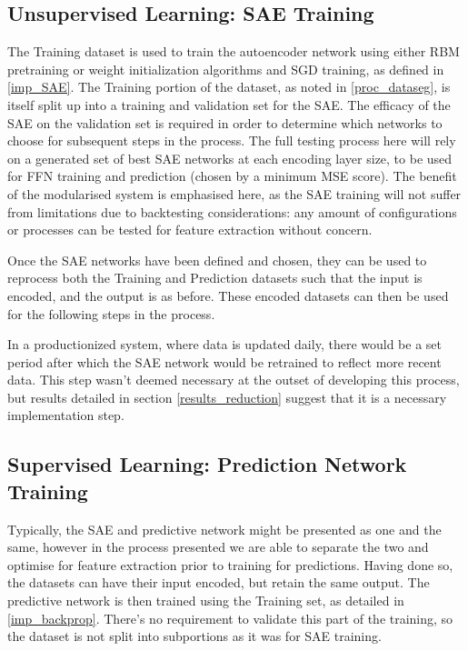 \documentclass[a4paper,11pt,oneside]{article}
\theoremstyle{plain}
\theoremstyle{definition}
\begin{document}
\subsection{Unsupervised Learning: SAE Training}\label{proc_sae}

The Training dataset is used to train the autoencoder network using either RBM pretraining or weight initialization algorithms and SGD training, as defined in \ref{imp_SAE}. The Training portion of the dataset, as noted in \ref{proc_dataseg}, is itself split up into a training and validation set for the SAE. The efficacy of the SAE on the validation set is required in order to determine which networks to choose for subsequent steps in the process. The full testing process here will rely on a generated set of best SAE networks at each encoding layer size, to be used for FFN training and prediction (chosen by a minimum MSE score). The benefit of the modularised system is emphasised here, as the SAE training will not suffer from limitations due to backtesting considerations: any amount of configurations or processes can be tested for feature extraction without concern. \newline

Once the SAE networks have been defined and chosen, they can be used to reprocess both the Training and Prediction datasets such that the input is encoded, and the output is as before. These encoded datasets can then be used for the following steps in the process. \newline

In a productionized system, where data is updated daily, there would be a set period after which the SAE network would be retrained to reflect more recent data. This step wasn't deemed necessary at the outset of developing this process, but results detailed in section \ref{results_reduction} suggest that it is a necessary implementation step.\newline

\subsection{Supervised Learning: Prediction Network Training}\label{proc_predictionnetwork}

Typically, the SAE and predictive network might be presented as one and the same, however in the process presented we are able to separate the two and optimise for feature extraction prior to training for predictions. Having done so, the datasets can have their input encoded, but retain the same output. The predictive network is then trained using the Training set, as detailed in \ref{imp_backprop}. There's no requirement to validate this part of the training, so the dataset is not split into subportions as it was for SAE training. \newline
\end{document}

